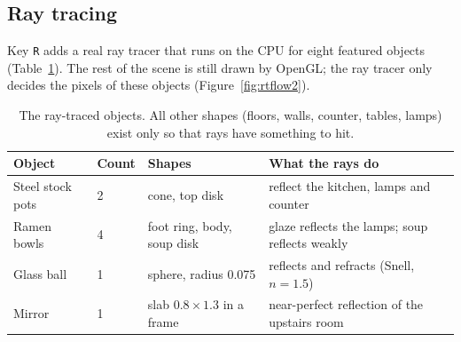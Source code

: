 \documentclass[10pt,a4paper]{article}
\newcommand{\code}[1]{\texttt{\small #1}}
\begin{document}
\subsection{Ray tracing}\label{sec:rt}
Key \code{R} adds a real ray tracer that runs on the CPU for eight featured objects (Table~\ref{tab:rtobj}). The rest of the scene is still drawn by OpenGL; the ray tracer only decides the pixels of these objects (Figure~\ref{fig:rtflow2}).
\begin{table}[htbp]
\centering\small
\begin{tabular}{@{}p{3.4cm}p{1.2cm}p{4.4cm}p{6.7cm}@{}}
\toprule
\textbf{Object} & \textbf{Count} & \textbf{Shapes} & \textbf{What the rays do}\\
\midrule
Steel stock pots & 2 & cone, top disk & reflect the kitchen, lamps and counter\\
Ramen bowls & 4 & foot ring, body, soup disk & glaze reflects the lamps; soup reflects weakly\\
Glass ball & 1 & sphere, radius 0.075 & reflects and refracts (Snell, $n=1.5$)\\
Mirror & 1 & slab $0.8\times1.3$ in a frame & near-perfect reflection of the upstairs room\\
\bottomrule
\end{tabular}
\caption{The ray-traced objects. All other shapes (floors, walls, counter, tables, lamps) exist only so that rays have something to hit.}\label{tab:rtobj}
\end{table}
\end{document}
